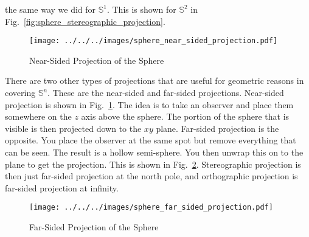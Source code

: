 \documentclass{article}
\theoremstyle{plain}
\theoremstyle{normal}
\begin{document}
        the same way we did for $\mathbb{S}^{1}$. This is shown for
        $\mathbb{S}^{2}$ in Fig.~\ref{fig:sphere_stereographic_projection}.
        \par\hfill\par
        \begin{figure}
            \centering
            \texttt{[image: ../../../images/sphere\_near\_sided\_projection.pdf]}
            \caption{Near-Sided Projection of the Sphere}
            \label{fig:sphere_near_sided_projection}
        \end{figure}
        There are two other types of projections that are useful for geometric
        reasons in covering $\mathbb{S}^{n}$. These are the near-sided and
        far-sided projections. Near-sided projection is shown in
        Fig.~\ref{fig:sphere_near_sided_projection}. The idea is to take an
        observer and place them somewhere on the $z$ axis above the sphere.
        The portion of the sphere that is visible is then projected down to the
        $xy$ plane. Far-sided projection is the opposite. You place the
        observer at the same spot but remove everything that can be seen.
        The result is a hollow semi-sphere. You then unwrap this on to the
        plane to get the projection. This is shown in
        Fig.~\ref{fig:sphere_far_sided_projection}. Stereographic projection
        is then just far-sided projection at the north pole, and orthographic
        projection is far-sided projection at infinity.
        \begin{figure}
            \centering
            \texttt{[image: ../../../images/sphere\_far\_sided\_projection.pdf]}
            \caption{Far-Sided Projection of the Sphere}
            \label{fig:sphere_far_sided_projection}
        \end{figure}
\end{document}
